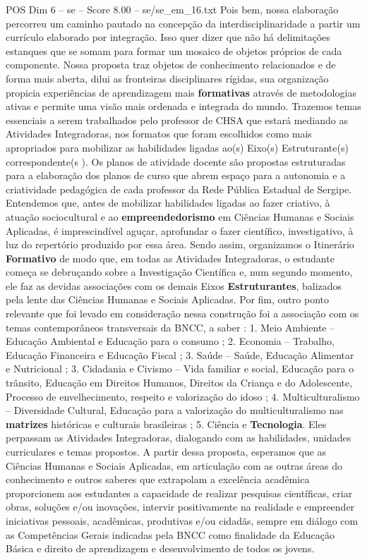\begin{textsample}{POS Dim 6 – se – Score 8.00 – se/se\_em\_16.txt}
Pois bem, nossa elaboração percorreu um caminho pautado na concepção da interdisciplinaridade a partir um currículo elaborado por integração.
Isso quer dizer que não há delimitações estanques que se somam para formar um mosaico de objetos próprios de cada componente.
Nossa proposta traz objetos de conhecimento relacionados e de forma mais aberta, dilui as fronteiras disciplinares rígidas, sua organização propicia experiências de aprendizagem mais \textbf{formativas} através de metodologias ativas e permite uma visão mais ordenada e integrada do mundo.
Trazemos temas essenciais a serem trabalhados pelo professor de CHSA que estará mediando as Atividades Integradoras, nos formatos que foram escolhidos como mais apropriados para mobilizar as habilidades ligadas ao(s) Eixo(s) Estruturante(s) correspondente(s ).
Os planos de atividade docente são propostas estruturadas para a elaboração dos planos de curso que abrem espaço para a autonomia e a criatividade pedagógica de cada professor da Rede Pública Estadual de Sergipe.
Entendemos que, antes de mobilizar habilidades ligadas ao fazer criativo, à atuação sociocultural e ao \textbf{empreendedorismo} em Ciências Humanas e Sociais Aplicadas, é imprescindível aguçar, aprofundar o fazer científico, investigativo, à luz do repertório produzido por essa área.
Sendo assim, organizamos o Itinerário \textbf{Formativo} de modo que, em todas as Atividades Integradoras, o estudante começa se debruçando sobre a Investigação Científica e, num segundo momento, ele faz as devidas associações com os demais Eixos \textbf{Estruturantes}, balizados pela lente das Ciências Humanas e Sociais Aplicadas.
Por fim, outro ponto relevante que foi levado em consideração nessa construção foi a associação com os temas contemporâneos transversais da BNCC, a saber : 1.
Meio Ambiente – Educação Ambiental e Educação para o consumo ; 2.
Economia – Trabalho, Educação Financeira e Educação Fiscal ; 3.
Saúde – Saúde, Educação Alimentar e Nutricional ; 3.
Cidadania e Civismo – Vida familiar e social, Educação para o trânsito, Educação em Direitos Humanos, Direitos da Criança e do Adolescente, Processo de envelhecimento, respeito e valorização do idoso ; 4.
Multiculturalismo – Diversidade Cultural, Educação para a valorização do multiculturalismo nas \textbf{matrizes} históricas e culturais brasileiras ; 5.
Ciência e \textbf{Tecnologia}.
Eles perpassam as Atividades Integradoras, dialogando com as habilidades, unidades curriculares e temas propostos.
A partir dessa proposta, esperamos que as Ciências Humanas e Sociais Aplicadas, em articulação com as outras áreas do conhecimento e outros saberes que extrapolam a excelência acadêmica proporcionem aos estudantes a capacidade de realizar pesquisas científicas, criar obras, soluções e/ou inovações, intervir positivamente na realidade e empreender iniciativas pessoais, acadêmicas, produtivas e/ou cidadãs, sempre em diálogo com as Competências Gerais indicadas pela BNCC como finalidade da Educação Básica e direito de aprendizagem e desenvolvimento de todos os jovens.

\end{textsample}

